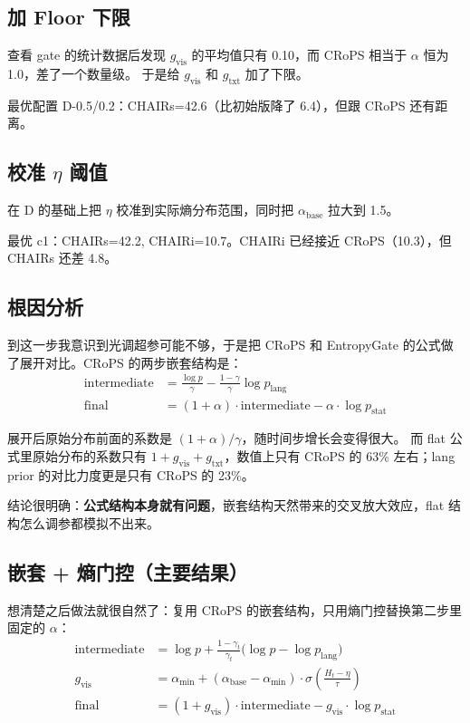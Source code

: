 \documentclass[12pt,a4paper]{ctexart}
\begin{document}
\subsection{加 Floor 下限}

查看 gate 的统计数据后发现 $g_{\text{vis}}$ 的平均值只有 0.10，而 CRoPS 相当于 $\alpha$ 恒为 1.0，差了一个数量级。
于是给 $g_{\text{vis}}$ 和 $g_{\text{txt}}$ 加了下限。

最优配置 D-0.5/0.2：CHAIRs=42.6（比初始版降了 6.4），但跟 CRoPS 还有距离。

\subsection{校准 $\eta$ 阈值}

在 D 的基础上把 $\eta$ 校准到实际熵分布范围，同时把 $\alpha_{\text{base}}$ 拉大到 1.5。

最优 c1：CHAIRs=42.2, CHAIRi=10.7。CHAIRi 已经接近 CRoPS（10.3），但 CHAIRs 还差 4.8。

\subsection{根因分析}

到这一步我意识到光调超参可能不够，于是把 CRoPS 和 EntropyGate 的公式做了展开对比。CRoPS 的两步嵌套结构是：
\begin{align}
\text{intermediate} &= \frac{\log p}{\gamma} - \frac{1-\gamma}{\gamma} \log p_{\text{lang}} \\
\text{final} &= (1+\alpha) \cdot \text{intermediate} - \alpha \cdot \log p_{\text{stat}}
\end{align}

展开后原始分布前面的系数是 $(1+\alpha)/\gamma$，随时间步增长会变得很大。
而 flat 公式里原始分布的系数只有 $1 + g_{\text{vis}} + g_{\text{txt}}$，数值上只有 CRoPS 的 63\% 左右；lang prior 的对比力度更是只有 CRoPS 的 23\%。

结论很明确：\textbf{公式结构本身就有问题}，嵌套结构天然带来的交叉放大效应，flat 结构怎么调参都模拟不出来。

\subsection{嵌套 + 熵门控（主要结果）}

想清楚之后做法就很自然了：复用 CRoPS 的嵌套结构，只用熵门控替换第二步里固定的 $\alpha$：
\begin{align}
\text{intermediate} &= \log p + \frac{1-\gamma_t}{\gamma_t}\bigl(\log p - \log p_{\text{lang}}\bigr) \label{eq:nested_step1} \\
g_{\text{vis}} &= \alpha_{\min} + (\alpha_{\text{base}} - \alpha_{\min}) \cdot \sigma\!\left(\frac{H_t - \eta}{\tau}\right) \label{eq:entropy_gate} \\
\text{final} &= (1 + g_{\text{vis}}) \cdot \text{intermediate} - g_{\text{vis}} \cdot \log p_{\text{stat}} \label{eq:nested_step2}
\end{align}
\end{document}
